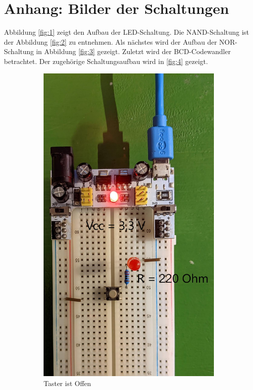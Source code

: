 \documentclass[
    paper=a4,
]{scrartcl}
\begin{document}
\appendix

\section{Anhang: Bilder der Schaltungen}
    \label{app:1}

    Abbildung \ref{fig:1} zeigt den Aufbau der LED-Schaltung. Die NAND-Schaltung ist der Abbildung \ref{fig:2} zu entnehmen. Als nächstes wird der Aufbau der NOR-Schaltung in Abbildung \ref{fig:3} gezeigt. Zuletzt wird der BCD-Codewandler betrachtet. Der zugehörige Schaltungsaufbau wird in \ref{fig:4} gezeigt.

    \begin{figure}
        \centering
        \begin{subfigure}[t]{0.5\textwidth}
            \centering
            \includegraphics[width=0.5\linewidth]{Anhang/Bild1.1.jpg}
            \caption{Taster ist Offen}
        \end{subfigure}\hfill%
        \begin{subfigure}[t]{0.5\textwidth}
            \centering

\end{subfigure}
\end{figure}
\end{document}
